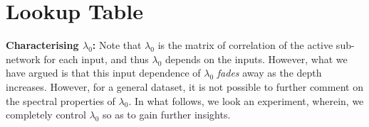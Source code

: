 \section{Lookup Table}
\textbf{Characterising $\lambda_0$:} Note that $\lambda_0$ is the matrix of correlation of the active sub-network for each input, and thus $\lambda_0$ depends on the inputs. However, what we have argued is that this input dependence of $\lambda_0$ \emph{fades} away as the depth increases. However, for a general dataset, it is not possible to further comment on the spectral properties of $\lambda_0$. In what follows, we look an experiment, wherein, we completely control $\lambda_0$ so as to gain further insights.

